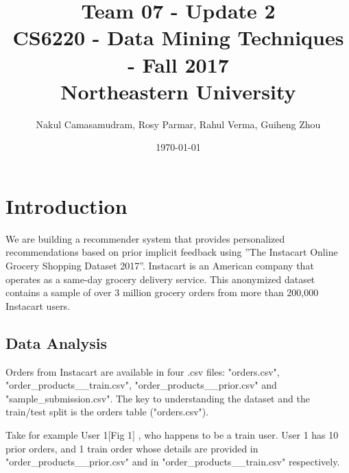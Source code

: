 \documentclass[letterpaper,12pt]{article}
\begin{document}
\title{Team 07 - Update 2 \\
	   \large CS6220 - Data Mining Techniques - Fall 2017 \\
	   \large Northeastern University}
\author{Nakul Camasamudram, Rosy Parmar, Rahul Verma, Guiheng Zhou}
\date{\today}
\maketitle


\section{Introduction}
We are building a recommender system that provides personalized recommendations based on prior implicit feedback using ”The Instacart Online Grocery Shopping Dataset 2017”. Instacart is an American company that operates as a same-day grocery delivery service. This anonymized dataset contains a sample of over 3 million grocery orders from more than 200,000 Instacart users.

\subsection{Data Analysis}

Orders from Instacart are available in four .csv files: "orders.csv", "order\_products\_\_train.csv", "order\_products\_\_prior.csv" and "sample\_submission.csv". The key to understanding the dataset and the train/test split is the orders table ("orders.csv").

Take for example User 1[Fig 1] , who happens to be a train user. User 1 has 10 prior orders, and 1 train order whose details are provided in "order\_products\_\_prior.csv" and in "order\_products\_\_train.csv" respectively.
\end{document}
